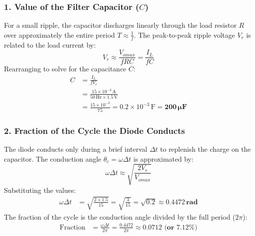\documentclass[12pt,a3paper]{article}
\begin{document}
\begin{enumerate}
\begin{tcolorbox}[enhanced,breakable,ansbox,colback=cA!4,colframe=cA,boxrule=0.8pt,arc=5pt,title={\textbf{Answer}},fonttitle=\bfseries\color{white},colbacktitle=cA]
\vspace{0.5em}
\hrulefill
\vspace{0.5em}

\subsubsection*{1. Value of the Filter Capacitor ($C$)}
For a small ripple, the capacitor discharges linearly through the load resistor $R$ over approximately the entire period $T \approx \frac{1}{f}$. The peak-to-peak ripple voltage $V_r$ is related to the load current by:
\begin{equation*}
    V_r \approx \frac{V_{omax}}{f R C} = \frac{I_L}{f C}
\end{equation*}
Rearranging to solve for the capacitance $C$:
\begin{align*}
    C &= \frac{I_L}{f V_r} \\
    &= \frac{15 \times 10^{-3}\,\text{A}}{50\,\text{Hz} \times 1.5\,\text{V}} \\
    &= \frac{15 \times 10^{-3}}{75} = 0.2 \times 10^{-3}\,\text{F} = \mathbf{200\,\mu\text{F}}
\end{align*}

\subsubsection*{2. Fraction of the Cycle the Diode Conducts}
The diode conducts only during a brief interval $\Delta t$ to replenish the charge on the capacitor. The conduction angle $\theta_c = \omega \Delta t$ is approximated by:
\begin{equation*}
    \omega \Delta t \approx \sqrt{\frac{2V_r}{V_{omax}}}
\end{equation*}
Substituting the values:
\begin{align*}
    \omega \Delta t &= \sqrt{\frac{2 \times 1.5}{15}} = \sqrt{\frac{3}{15}} = \sqrt{0.2} \approx \mathbf{0.4472\,\text{rad}}
\end{align*}
The fraction of the cycle is the conduction angle divided by the full period ($2\pi$):
\begin{align*}
    \text{Fraction} &= \frac{\omega \Delta t}{2\pi} = \frac{0.4472}{2\pi} \approx \mathbf{0.0712 \text{ (or } 7.12\%)}
\end{align*}


\end{tcolorbox}
\end{enumerate}
\end{document}
